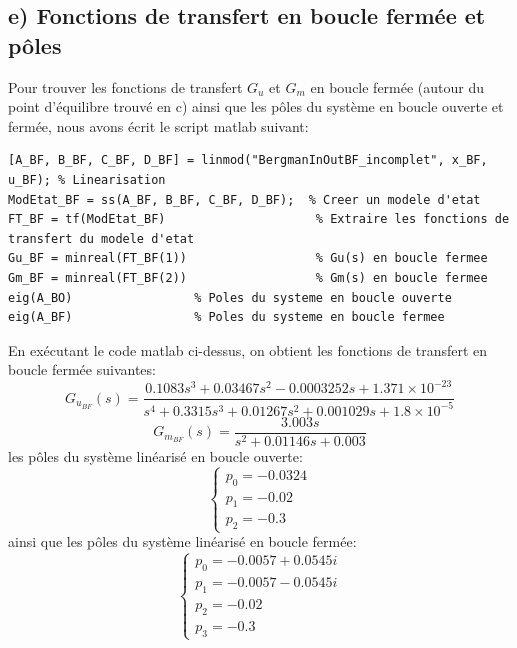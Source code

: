 \documentclass[11pt, a4paper]{article}
\begin{document}
\subsection*{e) Fonctions de transfert en boucle fermée et pôles}
Pour trouver les fonctions de transfert $G_u$ et $G_m$ en boucle fermée (autour du point d'équilibre trouvé en c) ainsi que les pôles du système en boucle ouverte et fermée, nous avons écrit le script matlab suivant:
\begin{lstlisting}[style=matlab]
[A_BF, B_BF, C_BF, D_BF] = linmod("BergmanInOutBF_incomplet", x_BF, u_BF); % Linearisation
ModEtat_BF = ss(A_BF, B_BF, C_BF, D_BF);  % Creer un modele d'etat 
FT_BF = tf(ModEtat_BF)                     % Extraire les fonctions de transfert du modele d'etat
Gu_BF = minreal(FT_BF(1))                  % Gu(s) en boucle fermee
Gm_BF = minreal(FT_BF(2))                  % Gm(s) en boucle fermee
eig(A_BO)                 % Poles du systeme en boucle ouverte
eig(A_BF)                 % Poles du systeme en boucle fermee
\end{lstlisting}
En exécutant le code matlab ci-dessus, on obtient les fonctions de transfert en boucle fermée suivantes:
$$\boxed{G_{u_{BF}}(s)=\frac{0.1083s^3+0.03467s^2-0.0003252s+1.371\times 10^{-23}}{s^4+0.3315s^3+0.01267s^2+0.001029s+1.8\times 10^{-5}}}$$
$$\boxed{G_{m_{BF}}(s)=\frac{3.003s}{s^2+0.01146s+0.003}}$$ 
les pôles du système linéarisé en boucle ouverte: 
$$\begin{cases}
p_0 = -0.0324\\
p_1 = -0.02\\
p_2 = -0.3
\end{cases}$$
ainsi que les pôles du système linéarisé en boucle fermée:
$$\begin{cases}
p_0 = -0.0057+0.0545i\\
p_1 = -0.0057-0.0545i\\
p_2 = -0.02\\
p_3 = -0.3
\end{cases}$$
\end{document}
